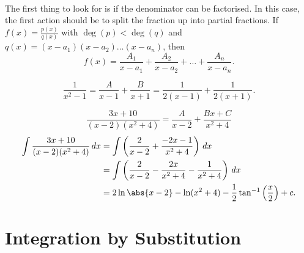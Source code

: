 \documentclass[../multivariate_calculus.tex]{subfiles}
\begin{document}
        \paragraph{}
        The first thing to look for is if the denominator can be factorised. 
        In this case, the first action should be to split the fraction up into partial fractions.
        If $f(x)=\frac{p(x)}{q(x)}$ with $\deg(p)<\deg(q)$ and $q(x)=(x-a_1)(x-a_2)\dots(x-a_n)$, then
        \begin{equation}
            f(x)=\frac{A_1}{x-a_1}+\frac{A_2}{x-a_2}+\dots+\frac{A_n}{x-a_n}.
        \end{equation}
        \begin{example}
            \begin{equation}
                \frac{1}{x^2-1} = \frac{A}{x-1}+\frac{B}{x+1}=\frac{1}{2(x-1)}+\frac{1}{2(x+1)}.
            \end{equation}
        \end{example}
        \begin{example}
            \begin{equation}
                \frac{3x+10}{(x-2)(x^2+4)} = \frac{A}{x-2} + \frac{Bx+C}{x^2+4}
            \end{equation}
            \begin{align}
                \int\frac{3x+10}{(x-2)(x^2+4)}\,dx &= \int\left(\frac{2}{x-2}+\frac{-2x-1}{x^2+4}\right)\,dx\\
                &=\int\left(\frac{2}{x-2}-\frac{2x}{x^2+4}-\frac{1}{x^2+4}\right)\,dx\\
                &=2\ln\abs{x-2}-\ln(x^2+4)-\frac{1}{2}\tan^{-1}\left(\frac{x}{2}\right)+c.
            \end{align}
        \end{example}

    \section{Integration by Substitution}
\end{document}
